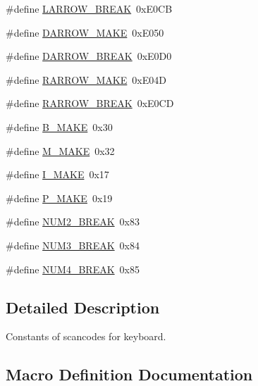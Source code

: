 \begin{DoxyCompactItemize}
\item 
\#define \hyperlink{group__scancodes_ga335ac9047c7a6d0c8631014766f96484}{L\+A\+R\+R\+O\+W\+\_\+\+B\+R\+E\+AK}~0x\+E0\+CB
\item 
\#define \hyperlink{group__scancodes_ga5e0594973062eb7d381ee43ff19a0369}{D\+A\+R\+R\+O\+W\+\_\+\+M\+A\+KE}~0x\+E050
\item 
\#define \hyperlink{group__scancodes_ga02742462a869b87ad2a34d8bc6a3fe58}{D\+A\+R\+R\+O\+W\+\_\+\+B\+R\+E\+AK}~0x\+E0\+D0
\item 
\#define \hyperlink{group__scancodes_ga365f3fec5881bea630c70f2c1098263f}{R\+A\+R\+R\+O\+W\+\_\+\+M\+A\+KE}~0x\+E04D
\item 
\#define \hyperlink{group__scancodes_ga9dd5fb482207f2c4f76696b443f76020}{R\+A\+R\+R\+O\+W\+\_\+\+B\+R\+E\+AK}~0x\+E0\+CD
\item 
\#define \hyperlink{group__scancodes_gaa7a13a11c6b4a4b22cc8c2dd5cca7a95}{B\+\_\+\+M\+A\+KE}~0x30
\item 
\#define \hyperlink{group__scancodes_ga357a1debdc4027db65b315366e9019dd}{M\+\_\+\+M\+A\+KE}~0x32
\item 
\#define \hyperlink{group__scancodes_ga124c06c60ba6b840260900c1fa975163}{I\+\_\+\+M\+A\+KE}~0x17
\item 
\#define \hyperlink{group__scancodes_gace8d1d82b15ad6363a0026421bc87fd6}{P\+\_\+\+M\+A\+KE}~0x19
\item 
\#define \hyperlink{group__scancodes_ga1921ae02c4c330897f27c61827f24a4c}{N\+U\+M2\+\_\+\+B\+R\+E\+AK}~0x83
\item 
\#define \hyperlink{group__scancodes_ga2b19345612635fb7cc2774bf1d18bbcd}{N\+U\+M3\+\_\+\+B\+R\+E\+AK}~0x84
\item 
\#define \hyperlink{group__scancodes_ga10d66972ee092e45e01d18921164ef72}{N\+U\+M4\+\_\+\+B\+R\+E\+AK}~0x85
\end{DoxyCompactItemize}


\subsection{Detailed Description}
Constants of scancodes for keyboard. 

\subsection{Macro Definition Documentation}
\hypertarget{group__scancodes_ga05826112c5acf959ee58dcacd8e9d065}{}\label{group__scancodes_ga05826112c5acf959ee58dcacd8e9d065} 
